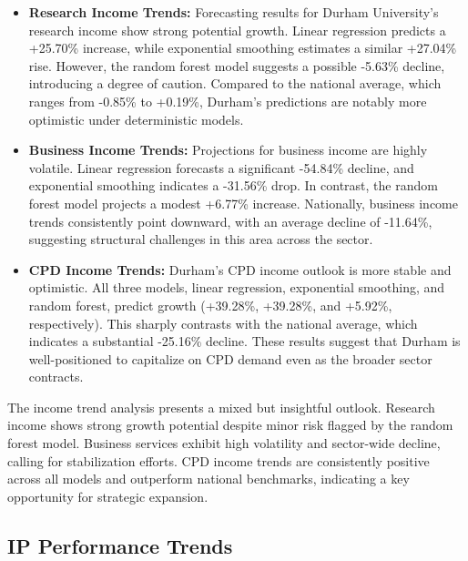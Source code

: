 \documentclass[journal,onecolumn, 10pt,draftclsnofoot]{IEEEtran}
\begin{document}
\begin{itemize}
    \item \textbf{Research Income Trends:} Forecasting results for Durham University's research income show strong potential growth. Linear regression predicts a +25.70\% increase, while exponential smoothing estimates a similar +27.04\% rise. However, the random forest model suggests a possible -5.63\% decline, introducing a degree of caution. Compared to the national average, which ranges from -0.85\% to +0.19\%, Durham's predictions are notably more optimistic under deterministic models.
    
    \item \textbf{Business Income Trends:} Projections for business income are highly volatile. Linear regression forecasts a significant -54.84\% decline, and exponential smoothing indicates a -31.56\% drop. In contrast, the random forest model projects a modest +6.77\% increase. Nationally, business income trends consistently point downward, with an average decline of -11.64\%, suggesting structural challenges in this area across the sector.
    
    \item \textbf{CPD Income Trends:} Durham's CPD income outlook is more stable and optimistic. All three models, linear regression, exponential smoothing, and random forest, predict growth (+39.28\%, +39.28\%, and +5.92\%, respectively). This sharply contrasts with the national average, which indicates a substantial -25.16\% decline. These results suggest that Durham is well-positioned to capitalize on CPD demand even as the broader sector contracts.
\end{itemize}

The income trend analysis presents a mixed but insightful outlook. Research income shows strong growth potential despite minor risk flagged by the random forest model. Business services exhibit high volatility and sector-wide decline, calling for stabilization efforts. CPD income trends are consistently positive across all models and outperform national benchmarks, indicating a key opportunity for strategic expansion.

\subsection{IP Performance Trends}
\end{document}

